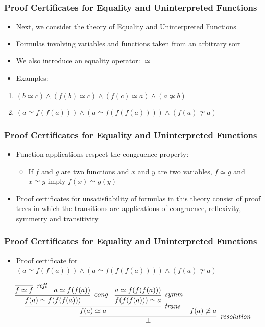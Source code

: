 \documentclass[usepdftitle=false,aspectratio=169,usenames,dvipsnames]{beamer}
\newcommand\vitem{\vfill\item}
\begin{document}
\begin{frame}
  \frametitle{Proof Certificates for Equality and Uninterpreted Functions}
  \begin{itemize}
    \item Next, we consider the theory of Equality and Uninterpreted Functions
    \vitem Formulas involving variables and functions taken from an arbitrary sort
    \vitem We also introduce an equality operator: $\simeq$
    \vitem Examples:
  \end{itemize}
  \begin{enumerate}
    \item $(b \simeq c) \wedge (f(b) \simeq c) \wedge (f(c) \simeq a) \wedge (a \not\simeq b)$
    \item $(a \simeq f(f(a))) \wedge (a \simeq f(f(f(a)))) \wedge (f(a) \not\simeq a)$
  \end{enumerate}
\end{frame}

\begin{frame}
  \frametitle{Proof Certificates for Equality and Uninterpreted Functions}
  \begin{itemize}
    \item Function applications respect the congruence property:
    \begin{itemize}
      \item If $f$ and $g$ are two functions and $x$ and $y$ are two variables, $f \simeq g$ and $x \simeq y$ imply $f(x) \simeq g(y)$
    \end{itemize}
    \vitem Proof certificates for unsatisfiability of formulas in this theory consist of proof trees in which the transitions are applications of congruence, reflexivity, symmetry and transitivity
  \end{itemize}
\end{frame}

\begin{frame}
  \frametitle{Proof Certificates for Equality and Uninterpreted Functions}
  \begin{itemize}
    \item Proof certificate for $(a \simeq f(f(a))) \wedge (a \simeq f(f(f(a)))) \wedge (f(a) \not\simeq a)$
  \end{itemize}
  \vfill
  \[
    \infer[\textit{resolution}]{\bot}{\infer[\textit{trans}]{f(a) \simeq a}{\infer[\textit{cong}]{f(a) \simeq f(f(f(a)))}{\infer[\textit{refl}]{f \simeq f}{} & a \simeq f(f(a))} & \infer[\textit{symm}]{f(f(f(a))) \simeq a}{a \simeq f(f(f(a)))}} & f(a) \not\simeq a}
  \]
\end{frame}
\end{document}
